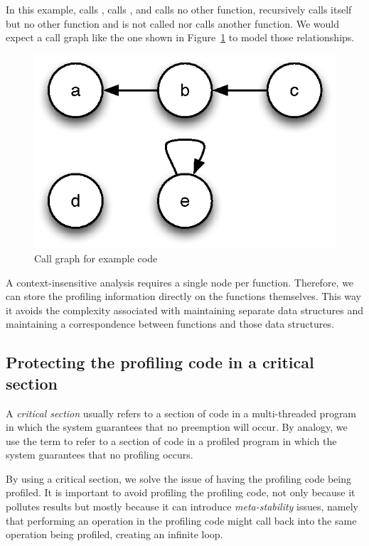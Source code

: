 
In this example,  calls ,  calls , and  calls no
other function,  recursively calls itself but no other function and
 is not called nor calls another function. We would expect a call graph
like the one shown in Figure~\ref{fig:CallGraph} to model those relationships.

\begin{figure}[htb]
\begin{center}
\includegraphics{figures/callgraph}
\caption{\label{fig:CallGraph} Call graph for example code}
\end{center}
\end{figure}

A context-insensitive analysis requires a single node per function. Therefore,
we can store the profiling information directly on the functions themselves.
This way it avoids the complexity associated with maintaining separate data
structures and maintaining a correspondence between functions and those data
structures.

\subsection{Protecting the profiling code in a critical section} 

A \textit{critical section} usually refers to a section of code in a
multi-threaded program in which the system guarantees that no preemption will
occur. By analogy, we use the term to refer to a section of code in a profiled
program in which the system guarantees that no profiling occurs.

By using a critical section, we solve the issue of having the profiling code
being profiled. It is important to avoid profiling the profiling code, not only
because it pollutes results but mostly because it can introduce
\textit{meta-stability} issues, namely that performing an operation in the
profiling code might call back into the same operation being profiled, creating
an infinite loop.

